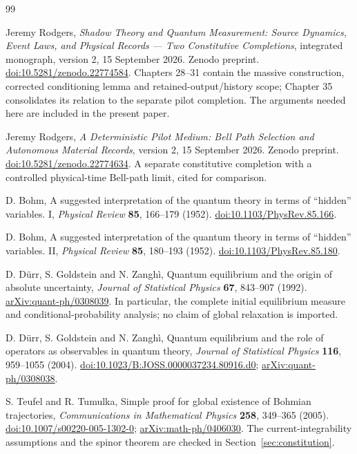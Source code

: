 \documentclass[11pt]{article}
\theoremstyle{definition}\newtheorem{assumption}[theorem]{Constitutive assumption}
\theoremstyle{remark}\newtheorem{remark}[theorem]{Remark}
\begin{document}
\begin{thebibliography}{99}
\raggedright

Jeremy Rodgers,
\emph{Shadow Theory and Quantum Measurement: Source Dynamics, Event Laws, and Physical Records --- Two Constitutive Completions},
integrated monograph, version 2, 15 September 2026. Zenodo preprint.
\href{https://doi.org/10.5281/zenodo.22774584}{doi:10.5281/zenodo.22774584}.
Chapters 28--31 contain the massive construction, corrected conditioning lemma and retained-output/history scope; Chapter 35 consolidates its relation to the separate pilot completion. The arguments needed here are included in the present paper.

Jeremy Rodgers,
\emph{A Deterministic Pilot Medium: Bell Path Selection and Autonomous Material Records},
version 2, 15 September 2026. Zenodo preprint.
\href{https://doi.org/10.5281/zenodo.22774634}{doi:10.5281/zenodo.22774634}.
A separate constitutive completion with a controlled physical-time Bell-path limit, cited for comparison.

D. Bohm,
A suggested interpretation of the quantum theory in terms of ``hidden'' variables. I,
\emph{Physical Review} \textbf{85}, 166--179 (1952).
\href{https://doi.org/10.1103/PhysRev.85.166}{doi:10.1103/PhysRev.85.166}.

D. Bohm,
A suggested interpretation of the quantum theory in terms of ``hidden'' variables. II,
\emph{Physical Review} \textbf{85}, 180--193 (1952).
\href{https://doi.org/10.1103/PhysRev.85.180}{doi:10.1103/PhysRev.85.180}.

D. D\"urr, S. Goldstein and N. Zangh\`i,
Quantum equilibrium and the origin of absolute uncertainty,
\emph{Journal of Statistical Physics} \textbf{67}, 843--907 (1992).
\href{https://arxiv.org/abs/quant-ph/0308039}{arXiv:quant-ph/0308039}.
In particular, the complete initial equilibrium measure and conditional-probability analysis; no claim of global relaxation is imported.

D. D\"urr, S. Goldstein and N. Zangh\`i,
Quantum equilibrium and the role of operators as observables in quantum theory,
\emph{Journal of Statistical Physics} \textbf{116}, 959--1055 (2004).
\href{https://doi.org/10.1023/B:JOSS.0000037234.80916.d0}{doi:10.1023/B:JOSS.0000037234.80916.d0};
\href{https://arxiv.org/abs/quant-ph/0308038}{arXiv:quant-ph/0308038}.

S. Teufel and R. Tumulka,
Simple proof for global existence of Bohmian trajectories,
\emph{Communications in Mathematical Physics} \textbf{258}, 349--365 (2005).
\href{https://doi.org/10.1007/s00220-005-1302-0}{doi:10.1007/s00220-005-1302-0};
\href{https://arxiv.org/abs/math-ph/0406030}{arXiv:math-ph/0406030}.
The current-integrability assumptions and the spinor theorem are checked in Section~\ref{sec:constitution}.


\end{thebibliography}
\end{document}
